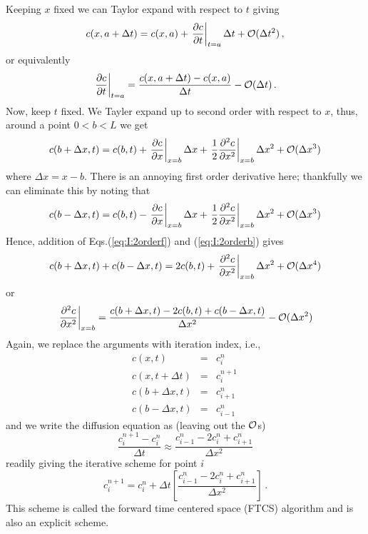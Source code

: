 Keeping $x$ fixed we can Taylor expand with respect to $t$ giving
\begin{equation}
  c(x, a+\Delta t) = c(x,a) + \left.\frac{\partial c}{\partial
    t}\right|_{t=a}\Delta t + \mathcal{O}(\Delta t^2) \, ,
\end{equation}
or equivalently
\begin{equation}
  \left. \frac{\partial c}{\partial t}\right|_{t=a} = 
  \frac{c(x, a+\Delta t)- c(x,a)}{\Delta t} - \mathcal{O}(\Delta t) \, .
\end{equation}
Now, keep $t$ fixed. We Tayler expand up to second order with respect to $x$, thus, 
around a point $0<b<L$ we get 
\begin{equation}
  c(b+\Delta x, t) = c(b,t) + \left.\frac{\partial c}{\partial x}\right|_{x=b}\Delta
  x + \left.\frac{1}{2}\frac{\partial^2 c}{\partial x^2}\right|_{x=b} \Delta x^2 +
  \mathcal{O}(\Delta x^3)
  \label{eq:I:2orderf}
\end{equation}
where $\Delta x = x-b$. There is an annoying first order derivative
here; thankfully we can eliminate this by noting that
\begin{equation}
  c(b-\Delta x, t) = c(b,t) - \left.\frac{\partial c}{\partial x}\right|_{x=b} \Delta
  x + \left.\frac{1}{2}\frac{\partial^2 c}{\partial x^2}\right|_{x=b} \Delta x^2 +
  \mathcal{O}(\Delta x^3)
   \label{eq:I:2orderb}
\end{equation}
Hence, addition of Eqs.(\ref{eq:I:2orderf}) and (\ref{eq:I:2orderb})
gives
\begin{equation}
  c(b+\Delta x, t) + c(b-\Delta x, t) = 2 c(b,t) + \left.\frac{\partial^2
    c}{\partial x^2}\right|_{x=b} \Delta x^2 + \mathcal{O}(\Delta x^4)
\end{equation}
or
\begin{equation}
  \left.\frac{\partial^2 c}{\partial x^2}\right|_{x=b} =
  \frac{c(b+\Delta x, t) - 2 c(b,t) + c(b-\Delta x, t) }{\Delta x^2} -
  \mathcal{O}(\Delta x^2) \label{eq:I:secondorder}
\end{equation}
Again, we replace the arguments with iteration index, i.e.,
\begin{eqnarray}
	c(x,t)&=&c_i^n \nonumber \, \\
	c(x,t+\Delta t)&=&c_i^{n+1} \, \nonumber \\ 
	c(b+\Delta x,t)&=&c_{i+1}^n \, \nonumber \\
	c(b-\Delta x,t) &=& c_{i-1}^n \,
	\end{eqnarray}
and we write the diffusion equation as (leaving out the $\mathcal{O}$s)
\begin{equation}
\frac{c_i^{n+1} - c_i^n}{\Delta t} \approx \frac{c_{i-1}^n -
  2c_i^n + c_{i+1}^n}{\Delta x^2} 
\end{equation}
readily giving the iterative scheme for point $i$
\begin{equation}
  c_i^{n+1} = c_i^n + \Delta t \left[\frac{c_{i-1}^n -2c_i^n +
    c_{i+1}^n}{\Delta x^2}\right] \, .
\end{equation}
This scheme is called the forward time centered space (FTCS) algorithm
and is also an explicit scheme. 

